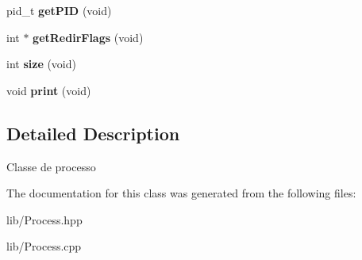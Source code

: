 \begin{DoxyCompactItemize}
\item 
\hypertarget{classProcess_aec20c9e63556604a0c2589f2aa5fcf42}{
pid\_\-t {\bfseries getPID} (void)}
\label{classProcess_aec20c9e63556604a0c2589f2aa5fcf42}

\item 
\hypertarget{classProcess_ac2fa6cd64f012be1dd57f864f8fe85a3}{
int $\ast$ {\bfseries getRedirFlags} (void)}
\label{classProcess_ac2fa6cd64f012be1dd57f864f8fe85a3}

\item 
\hypertarget{classProcess_aba1961b67fc9143157a356b2c4e45638}{
int {\bfseries size} (void)}
\label{classProcess_aba1961b67fc9143157a356b2c4e45638}

\item 
\hypertarget{classProcess_ab902253708fb4bb5196d6c31f2ddaf21}{
void {\bfseries print} (void)}
\label{classProcess_ab902253708fb4bb5196d6c31f2ddaf21}

\end{DoxyCompactItemize}


\subsection{Detailed Description}
Classe de processo 

The documentation for this class was generated from the following files:\begin{DoxyCompactItemize}
\item 
lib/Process.hpp\item 
lib/Process.cpp\end{DoxyCompactItemize}
